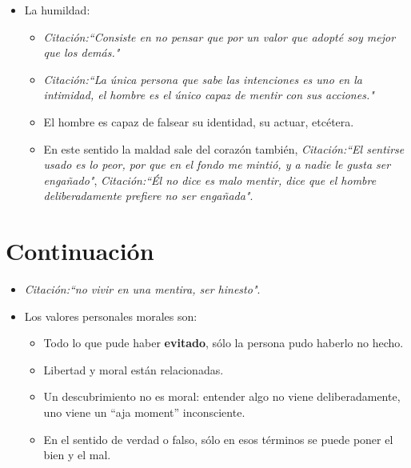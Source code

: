 \begin{itemize}
    
    \item La humildad:
        \begin{itemize}
            \item \emph{Citación:``Consiste en no pensar que por un valor que adopté soy mejor que los demás."}
            \item \emph{Citación:``La única persona que sabe las intenciones es uno en la intimidad, el hombre es el único capaz de mentir con sus acciones."}
            \item El hombre es capaz de falsear su identidad, su actuar, etcétera.
            \item En este sentido la maldad sale del corazón también, \emph{Citación:``El sentirse usado es lo peor, por que en el fondo me mintió, y a nadie le gusta ser engañado"}, \emph{Citación:``Él no dice es malo mentir, dice que el hombre deliberadamente prefiere no ser engañada"}. 
        \end{itemize}
\end{itemize}


\section{Continuación}
\begin{itemize}
    \item \emph{Citación:``no vivir en una mentira, ser hinesto"}.
    \item Los valores personales morales son:
        \begin{itemize}
            \item Todo lo que pude haber \textbf{evitado}, sólo la persona pudo haberlo no hecho.
            \item Libertad y moral están relacionadas.
            \item Un descubrimiento no es moral: entender algo no viene deliberadamente, uno viene un ``aja moment'' inconsciente.
            \item En el sentido de verdad o falso, sólo en esos términos se puede poner el bien y el mal.
        \end{itemize}
\end{itemize}

